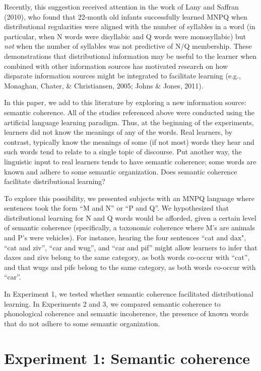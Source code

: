 \documentclass[man,floatsintext]{apa6}
\begin{document}
Recently, this suggestion received attention in the work of Lany and Saffran (2010), who found that 22-month old infants successfully learned MNPQ when distributional regularities were aligned with the number of syllables in a word (in particular, when N words were disyllabic and Q words were monosyllabic) but \emph{not} when the number of syllables was not predictive of N/Q membership. These demonstrations that distributional information may be useful to the learner when combined with other information sources has motivated research on how disparate information sources might be integrated to facilitate learning (e.g., Monaghan, Chater, \& Christiansen, 2005; Johns \& Jones, 2011).

In this paper, we add to this literature by exploring a new information source: semantic coherence. All of the studies referenced above were conducted using the artificial language learning paradigm. Thus, at the beginning of the experiments, learners did not know the meanings of any of the words. Real learners, by contrast, typically know the meanings of some (if not most) words they hear and such words tend to relate to a single topic of discourse. Put another way, the linguistic input to real learners tends to have semantic coherence; some words are known and adhere to some semantic organization. Does semantic coherence facilitate distributional learning?

To explore this possibility, we presented subjects with an MNPQ language where sentences took the form ``M and N'' or ``P and Q''. We hypothesized that distributional learning for N and Q words would be afforded, given a certain level of semantic coherence (specifically, a taxonomic coherence where M's are animals and P's were vehicles). For instance, hearing the four sentences ``cat and dax", ``cat and ziv'', ``car and wug'', and ``car and pif'' might allow learners to infer that daxes and zivs belong to the same category, as both words co-occur with ``cat'', and that wugs and pifs belong to the same category, as both words co-occur with ``car''.

In Experiment 1, we tested whether semantic coherence facilitated distributional learning. In Experiments 2 and 3, we compared semantic coherence to phonological coherence and semantic incoherence, the presence of known words that do not adhere to some semantic organization.

\section{Experiment 1: Semantic coherence}
\end{document}
